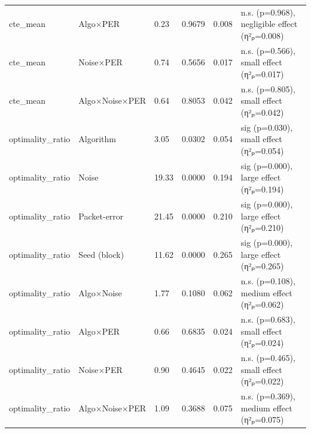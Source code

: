 \begin{tabular}{llllll}
cte\_mean & Algo×PER & 0.23 & 0.9679 & 0.008 & n.s. (p=0.968), negligible effect (η²ₚ=0.008) \\
cte\_mean & Noise×PER & 0.74 & 0.5656 & 0.017 & n.s. (p=0.566), small effect (η²ₚ=0.017) \\
cte\_mean & Algo×Noise×PER & 0.64 & 0.8053 & 0.042 & n.s. (p=0.805), small effect (η²ₚ=0.042) \\
optimality\_ratio & Algorithm & 3.05 & 0.0302 & 0.054 & sig (p=0.030), small effect (η²ₚ=0.054) \\
optimality\_ratio & Noise & 19.33 & 0.0000 & 0.194 & sig (p=0.000), large effect (η²ₚ=0.194) \\
optimality\_ratio & Packet-error & 21.45 & 0.0000 & 0.210 & sig (p=0.000), large effect (η²ₚ=0.210) \\
optimality\_ratio & Seed (block) & 11.62 & 0.0000 & 0.265 & sig (p=0.000), large effect (η²ₚ=0.265) \\
optimality\_ratio & Algo×Noise & 1.77 & 0.1080 & 0.062 & n.s. (p=0.108), medium effect (η²ₚ=0.062) \\
optimality\_ratio & Algo×PER & 0.66 & 0.6835 & 0.024 & n.s. (p=0.683), small effect (η²ₚ=0.024) \\
optimality\_ratio & Noise×PER & 0.90 & 0.4645 & 0.022 & n.s. (p=0.465), small effect (η²ₚ=0.022) \\
optimality\_ratio & Algo×Noise×PER & 1.09 & 0.3688 & 0.075 & n.s. (p=0.369), medium effect (η²ₚ=0.075) \\
\bottomrule
\end{tabular}
